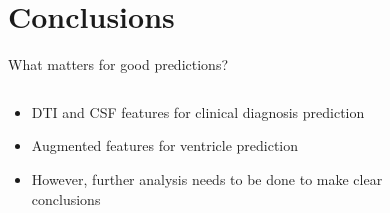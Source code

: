 \documentclass[8pt,xcolor=table,aspectratio=169]{beamer}
\begin{document}
\section{Conclusions}


\begin{frame}{What matters for good predictions?}


\begin{columns}[t]
 
\begin{column}[t]{0.3\textwidth}

\begin{itemize}
 \item DTI and CSF features for clinical diagnosis prediction
 
 \vspace{2em}
 
 \item Augmented features for ventricle prediction
 
 \vspace{2em}
 
 \item However, further analysis needs to be done to make clear conclusions
\end{itemize}
\end{column}
\begin{column}[t]{0.6\textwidth}

\vspace{-2em}
\begin{figure}
\centering
{}
\end{figure}

\end{column}

\end{columns}

\end{frame}
\end{document}
